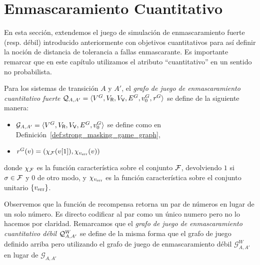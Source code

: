 \section{Enmascaramiento Cuantitativo} \label{sec:QuantMask_mask}
En esta sección, extendemos el juego de simulación de enmascaramiento fuerte (resp. débil) introducido anteriormente con objetivos cuantitativos para así definir la noción de distancia de tolerancia a fallas enmascarante.
Es importante remarcar que en este capítulo utilizamos el atributo  ``cuantitativo'' en un sentido no probabilista.
\begin{definition}  
  Para los sistemas de transición $A$ y $A'$, el \emph{grafo de juego de enmascaramiento cuantitativo fuerte} 
  $\QMStrGame = \langle V^G, V_\Refuter, V_\Verifier, E^G,  \InitVertex^G,  \reward^G \rangle$ se define de la siguiente manera:
 
\begin{itemize}
\item
  $\mathcal{G}_{A, A'}=\langle V^G, V_\Refuter, V_\Verifier, E^G, \InitVertex^G \rangle$ se define como en Definición~\ref{def:strong_masking_game_graph},
\item
  $ \reward^G(v) = (\chi_{\Faults}(\pr{1}{v}), \chi_{\ErrorSt}(v))$

\end{itemize}
%
donde $\chi_{\Faults}$ es la función característica sobre el conjunto $\Faults$, devolviendo $1$ si $\sigma \in \Faults$ y $0$ de otro modo, y $\chi_{\ErrorSt}$ es la función característica sobre el conjunto unitario $\{\ErrorSt\}$.
\end{definition}
Observemos que la función de recompensa retorna un par de números en lugar de un solo número. Es directo codificar al par como un único numero pero no lo hacemos por claridad. Remarcamos que el
\emph{grafo de juego de enmascaramiento cuantitativo débil} $\QMWeakGame$
se define de la misma forma que el grafo de juego definido arriba pero utilizando el grafo de juego de enmascaramiento débil $\mathcal{G}^W_{A, A'}$ en lugar de 
$\mathcal{G}_{A, A'}$


